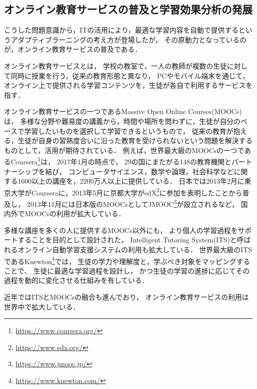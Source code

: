 \subsection{オンライン教育サービスの普及と学習効果分析の発展}
こうした問題意識から，ITの活用により，最適な学習内容を自動で提供するというアダプティブラーニングの考え方が登場したが，
その原動力となっているのが，オンライン教育サービスの普及である．

オンライン教育サービスとは，
学校の教室で，一人の教師が複数の生徒に対して同時に授業を行う，従来の教育形態と異なり，
PCやモバイル端末を通じて，
オンライン上で提供される学習コンテンツを，生徒が各自で利用するサービスを指す．

オンライン教育サービスの一つであるMassive Open Online Courses(MOOCs)\cite{mcauley2010mooc, pappano2012year,siemens2013massive}は，
多様な分野や難易度の講義から，時間や場所を問わずに，生徒が自分のペースで学習したいものを選択して学習できるというもので，
従来の教育が抱える，生徒が自身の習熟度合いに沿った教育を受けられないという問題を解決するものとして，活用が期待されている．
例えば，世界最大級のMOOCsの一つであるCoursera\footnote{\url{https://www.coursera.org/}}は，
2017年1月の時点で，
29の国にまたがる148の教育機関とパートナーシップを結び，
コンピュータサイエンス，数学や論理，社会科学などに関する1600以上の講座を，2200万人以上に提供している．
日本では2013年2月に東京大学がCourseraに，2013年5月に京都大学がedX\footnote{\url{https://www.edx.org/}}に参加を表明したことから普及し，
2013年11月には日本版のMOOCsとしてJMOOC\footnote{\url{https://www.jmooc.jp/}}が設立されるなど，
国内外でMOOCsの利用が拡大している．

多様な講座を多くの人に提供するMOOCs以外にも，
より個人の学習過程をサポートすることを目的として設計された，
Intelligent Tutoring System(ITS)と呼ばれるオンライン自動学習支援システムの利用も拡大している．
世界最大級のITSであるKnewton\footnote{\url{https://www.knewton.com/}}では，
生徒の学力や理解度と，学ぶべき対象をマッピングすることで、
生徒に最適な学習過程を設計し，
かつ生徒の学習の進捗に応じてその過程を動的に変化させる仕組みを有している\cite{upbin2012knewton}．

近年ではITSとMOOCsの融合も進んでおり\cite{aleven2015beginning}，
オンライン教育サービスの利用は世界中で拡大している．



